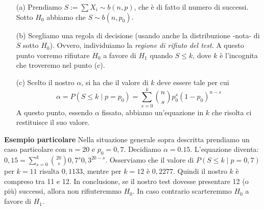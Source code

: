 \begin{enumerate}
\item [(a)] Prendiamo $S:=\sum X_i \sim b(n,p)$, che è di fatto il numero di successi. Sotto $H_0$ abbiamo che $S \sim b(n,p_0)$.
\item [(b)] Scegliamo una regola di decisione (usando anche la distribuzione -nota- di $S$ sotto $H_0$). Ovvero, individuiamo la \textit{regione di rifiuto del test}. A questo punto vorremo rifiutare $H_0$ a favore di $H_1$ quando $S \leq k$, dove $k$ è l'incognita che troveremo nel punto (c).
\item [(c)] Scelto il nostro $\alpha$, si ha che il valore di $k$ deve essere tale per cui 
			$$\alpha = P(S \leq k \mid p=p_0) = \displaystyle \sum_{s=0}^k \binom{n}{s} p_0^s (1-p_0)^{n-s}$$
A questo punto, essendo $\alpha$ fissato, abbiamo un'equazione in $k$ che risolta ci restituisce il suo valore.
\end{enumerate}
\textbf{Esempio particolare} Nella situazione generale sopra descritta prendiamo un caso particolare con $n=20$ e $p_0=0,7$. Decidiamo $\alpha = 0.15$. L'equazione diventa: $0,15 = \sum_{s=0}^k \binom{20}{s} 0,7^s 0,3^{20-s}$. Osserviamo che il valore di $P(S \leq k \mid p=0,7)$ per $k=11$ risulta $0,1133$, mentre per $k=12$ è $0,2277$. Quindi il nostro $k$ è compreso tra 11 e 12. In conclusione, se il nostro test dovesse presentare 12 (o più) successi, allora non rifiuteremmo $H_0$. In caso contrario scarteremmo $H_0$ a favore di $H_1$.

